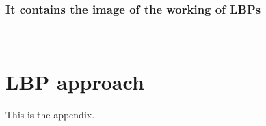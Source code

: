 \documentclass{article}
\begin{document}

\subsubsection{It contains the image of the working of LBPs}\cite{ref:Spoof_two}

\cleardoublepage

\cleardoublepage\

\appendix
\section{LBP approach}
This is the appendix.
\end{document}
